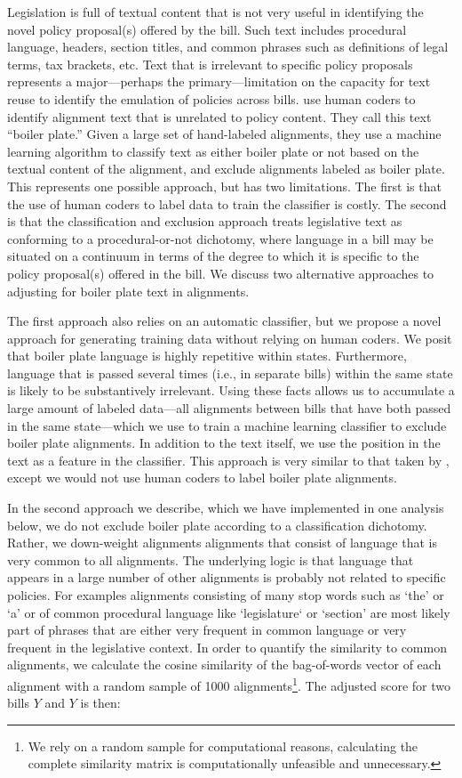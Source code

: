 \documentclass[12pt]{article} %
\begin{document}
Legislation is full of textual content that is not very useful in identifying the novel policy proposal(s) offered by the bill. Such text includes procedural language, headers, section titles, and common phrases such as definitions of legal terms, tax brackets, etc. Text that is irrelevant to specific policy proposals represents a major---perhaps the primary---limitation on the capacity for text reuse to identify the emulation of policies across bills. \citet{wilkerson2015tracing} use human coders to identify alignment text that is unrelated to policy content. They call this text ``boiler plate.'' Given a large set of hand-labeled alignments, they use a machine learning algorithm to classify text as either boiler plate or not based on the textual content of the alignment, and exclude alignments labeled as boiler plate. This represents one possible approach, but has two limitations. The first is that the use of human coders to label data to train the classifier is costly. The second is that the classification and exclusion approach treats legislative text as conforming to a procedural-or-not dichotomy, where language in a bill may be situated on a continuum in terms of the degree to which it is specific to the policy proposal(s) offered in the bill. We discuss two alternative approaches to adjusting for boiler plate text in alignments.

The first approach also relies on an automatic classifier, but we propose a novel approach for
generating training data without relying on human coders. We posit that boiler plate language is highly repetitive within states. Furthermore, language
that is passed several times (i.e., in separate bills) within the same state is likely to be
substantively irrelevant. Using these facts allows us to accumulate a large amount of labeled data---all alignments between bills that have both passed in the same state---which we use to train a machine learning classifier to exclude boiler plate alignments. In addition to the text
itself, we use the position in the text as a feature in the classifier. This approach is very similar to that taken by \citet{wilkerson2015tracing}, except we would not use human coders to label boiler plate alignments.

In the second approach we describe, which we have implemented in one analysis
below, we do not exclude boiler plate according to a classification dichotomy.
Rather, we down-weight alignments alignments that consist of language that is
very common to all alignments. The underlying logic is that language that
appears in a large number of other alignments is probably not related to
specific policies. For examples alignments consisting of many stop words such as
`the' or `a' or of common procedural language like `legislature` or `section'
are most likely part of phrases that are either very frequent in common language
or very frequent in the legislative context. 
In order to quantify the similarity to common alignments, we calculate the
cosine similarity of the bag-of-words vector of each alignment with a random
sample of 1000 alignments\footnote{We rely on a random sample for computational
reasons, calculating the complete similarity matrix is computationally
unfeasible and unnecessary.}. The adjusted score for two bills $Y$ and $Y$ is
then:
\end{document}
